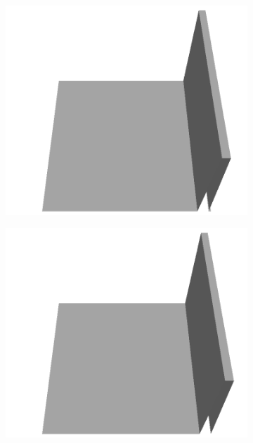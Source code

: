 \documentclass[../document.tex]{subfiles}
\begin{document}
\begin{figure}[H]
\begin{subfigure}[b]{0.065\textwidth}
    \includegraphics[width=\linewidth]{../img/5/custom_patches/walls_front/all/03-3d.png}
    \end{subfigure}
    \begin{subfigure}[b]{0.065\textwidth}
    \includegraphics[width=\linewidth]{../img/5/custom_patches/walls_front/all/02-3d.png}
    \end{subfigure}
    \begin{subfigure}[b]{0.065\textwidth}

\end{subfigure}
\end{figure}
\end{document}
